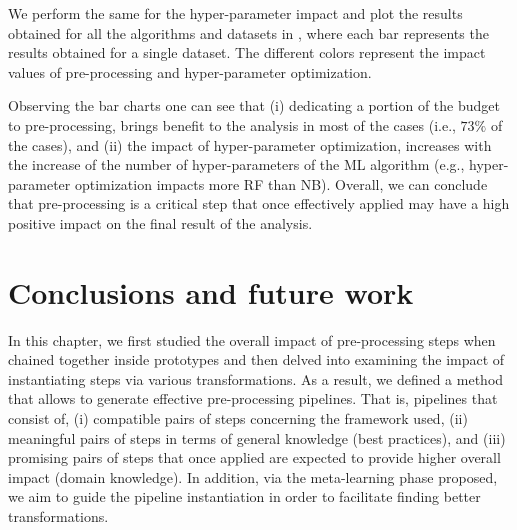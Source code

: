 We perform the same for the hyper-parameter impact and plot the results obtained for all the algorithms and datasets in , where each bar represents the results obtained for a single dataset.
The different colors represent the impact values of pre-processing and hyper-parameter optimization.

Observing the bar charts one can see that (i) dedicating a portion of the budget to pre-processing, brings benefit to the analysis in most of the cases (i.e., $73\%$ of the cases), and (ii) the impact of hyper-parameter optimization, increases with the increase of the number of hyper-parameters of the ML algorithm (e.g., hyper-parameter optimization impacts more RF than NB).
Overall, we can conclude that pre-processing is a critical step that once effectively applied may have a high positive impact on the final result of the analysis.

\section{Conclusions and future work}
\label{sec:conclusions}

In this chapter, we first studied the overall impact of pre-processing steps when chained together inside prototypes and then delved into examining the impact of instantiating steps via various transformations.
As a result, we defined a method that allows to generate effective pre-processing pipelines.
That is, pipelines that consist of, (i) compatible pairs of steps concerning the framework used,  (ii) meaningful pairs of steps in terms of general knowledge (best practices), and (iii) promising pairs of steps that once applied are expected to provide higher overall impact (domain knowledge).
In addition, via the meta-learning phase proposed, we aim to guide the pipeline instantiation in order to facilitate finding better transformations.

